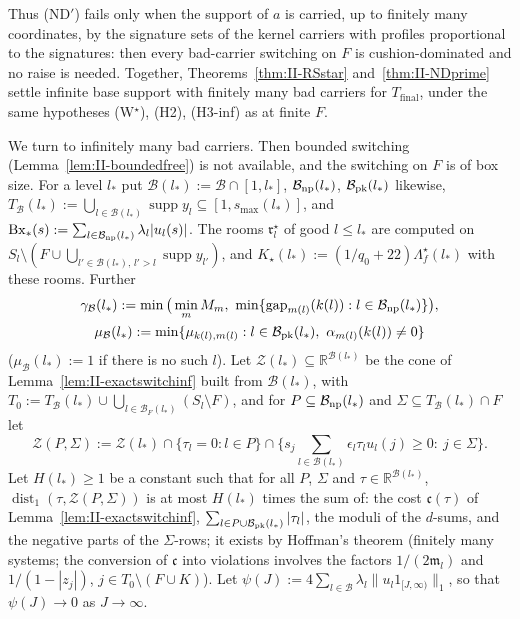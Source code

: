 \documentclass[10pt]{amsart}
\theoremstyle{definition}
\theoremstyle{remark}
\newcommand{\supp}{\operatorname{supp}}
\newcommand{\dist}{\operatorname{dist}}
\newcommand{\R}{\mathbb R}
\newcommand{\gap}{\operatorname{gap}}
\begin{document}
Thus (ND$'$) fails only when the support of $a$ is carried, up to finitely
many coordinates, by the signature sets of the kernel carriers with profiles
proportional to the signatures: then every bad-carrier switching on $F$ is
cushion-dominated and no raise is needed.  Together,
Theorems~\ref{thm:II-RSstar} and~\ref{thm:II-NDprime} settle infinite base
support with finitely many bad carriers for $T_{\mathrm{final}}$, under the
same hypotheses (W$^\star$), (H2), (H3-inf) as at finite $F$.

\smallskip
We turn to infinitely many bad carriers.  Then bounded switching
(Lemma~\ref{lem:II-boundedfree}) is not available, and the switching on $F$
is of box size.  For a level $l_*$ put $\mathcal B(l_*):=\mathcal B\cap
[1,l_*]$, $\mathcal B_{\rm np}(l_*)$, $\mathcal B_{\rm pk}(l_*)$ likewise,
$T_{\mathcal B}(l_*):=\bigcup_{l\in\mathcal B(l_*)}\supp y_l\subseteq
[1,s_{\max}(l_*)]$, and $\mathrm{Bx}_*(s):=\sum_{l\in\mathcal B_{\rm np}(l_*)}
\lambda_l|u_l(s)|$.  The rooms $\mathfrak r^\star_l$ of good $l\le l_*$ are
computed on $S_l\setminus(F\cup\bigcup_{l'\in\mathcal B(l_*),\,l'>l}\supp y_{l'})$,
and $K_\star(l_*):=(1/q_0+22)\Lambda^\star_f(l_*)$ with these rooms.  Further
\begin{gather*}
 \gamma_{\mathcal B}(l_*):=\min\big(\min_mM_m,\ \min\{\gap_{m(l)}(k(l)):l\in
 \mathcal B_{\rm np}(l_*)\}\big),\\
 \mu_{\mathcal B}(l_*):=\min\{\mu_{k(l),m(l)}:
 l\in\mathcal B_{\rm pk}(l_*),\ \alpha_{m(l)}(k(l))\ne0\}
\end{gather*}
($\mu_{\mathcal B}(l_*):=1$ if there is no such $l$).  Let $\mathcal Z(l_*)
\subseteq\R^{\mathcal B(l_*)}$ be the cone of Lemma~\ref{lem:II-exactswitchinf}
built from $\mathcal B(l_*)$, with $T_0:=T_{\mathcal B}(l_*)\cup\bigcup_{l\in
\mathcal B_F(l_*)}(S_l\setminus F)$, and for $P\subseteq\mathcal B_{\rm np}(l_*)$
and $\Sigma\subseteq T_{\mathcal B}(l_*)\cap F$ let
\[
 \mathcal Z(P,\Sigma):=\mathcal Z(l_*)\cap\{\tau_l=0:l\in P\}\cap\Big\{s_j
 \sum_{l\in\mathcal B(l_*)}\epsilon_l\tau_lu_l(j)\ge0:\ j\in\Sigma\Big\}.
\]
Let $H(l_*)\ge1$ be a constant such that for all $P$, $\Sigma$ and
$\tau\in\R^{\mathcal B(l_*)}$, $\dist_1(\tau,\mathcal Z(P,\Sigma))$ is at most
$H(l_*)$ times the sum of: the cost $\mathfrak c(\tau)$ of
Lemma~\ref{lem:II-exactswitchinf}, $\sum_{l\in P\cup\mathcal B_{\rm pk}(l_*)}
|\tau_l|$, the moduli of the $d$-sums, and the negative parts of the
$\Sigma$-rows; it exists by Hoffman's theorem (finitely many systems; the
conversion of $\mathfrak c$ into violations involves the factors
$1/(2\mathfrak m_l)$ and $1/(1-|z_j|)$, $j\in T_0\setminus(F\cup K)$).
Let $\psi(J):=4\sum_{l\in\mathcal B}\lambda_l\|u_l1_{[J,\infty)}\|_1$, so that
$\psi(J)\to0$ as $J\to\infty$.
\end{document}
